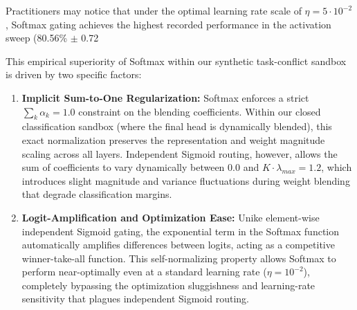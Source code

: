 Practitioners may notice that under the optimal learning rate scale of $\eta = 5 \cdot 10^{-2}$, Softmax gating achieves the highest recorded performance in the activation sweep (80.56\% $\pm$ 0.72%

This empirical superiority of Softmax within our synthetic task-conflict sandbox is driven by two specific factors:
\begin{enumerate}
    \item \textbf{Implicit Sum-to-One Regularization:} Softmax enforces a strict $\sum_k \alpha_k = 1.0$ constraint on the blending coefficients. Within our closed classification sandbox (where the final head is dynamically blended), this exact normalization preserves the representation and weight magnitude scaling across all layers. Independent Sigmoid routing, however, allows the sum of coefficients to vary dynamically between $0.0$ and $K \cdot \lambda_{max} = 1.2$, which introduces slight magnitude and variance fluctuations during weight blending that degrade classification margins.
    \item \textbf{Logit-Amplification and Optimization Ease:} Unike element-wise independent Sigmoid gating, the exponential term in the Softmax function automatically amplifies differences between logits, acting as a competitive winner-take-all function. This self-normalizing property allows Softmax to perform near-optimally even at a standard learning rate ($\eta = 10^{-2}$), completely bypassing the optimization sluggishness and learning-rate sensitivity that plagues independent Sigmoid routing.
\end{enumerate}

